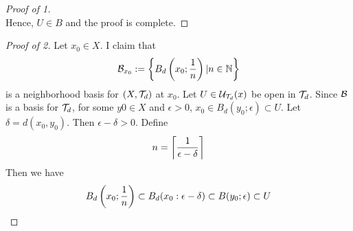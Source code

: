 \begin{prop}
\begin{proof}[Proof of 1]
\begin{equation}
        \end{equation}
        Hence, $U \in B$ and the proof is complete. 
    \end{proof}
    \begin{proof}[Proof of 2]
        Let $x_0 \in X$. 
        I claim that 
        \begin{equation}
            \mathcal{B}_{x_0}:= \left\{ B_d\left( x_0; \frac{1}{n}\right) | n \in \mathbb{N}\right\}
        \end{equation}
        is a neighborhood basis for $(X,\mathcal{T}_d)$ at $x_0$. 
        Let $U \in \mathcal{U}_{\mathcal{T}_d}(x)$ be open in $\mathcal{T}_d$. 
        Since $\mathcal{B}$ is a basis for $\mathcal{T}_d$, for some $y0 \in X$ and $\epsilon > 0$, 
        $x_0 \in B_d(y_0; \epsilon) \subset U$. 
        Let $\delta = d(x_0, y_0)$. Then $\epsilon - \delta > 0$. 
        Define
        \begin{equation}
            n = \left\lceil  \frac{1}{\epsilon - \delta} \right\rceil
        \end{equation}
        Then we have 
        \begin{equation}
            B_d\left( x_0 ; \frac{1}{n}\right) \subset B_d(x_0 : \epsilon - \delta) \subset B(y_0 ; \epsilon) \subset U
        \end{equation}
    \end{proof}
\end{prop}
